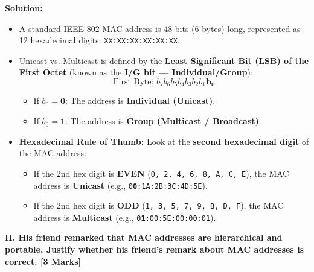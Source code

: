 \documentclass[11pt,a4paper]{article}
\begin{document}
\textbf{Solution:}
\begin{itemize}
    \item A standard IEEE 802 MAC address is 48 bits (6 bytes) long, represented as 12 hexadecimal digits: \texttt{XX:XX:XX:XX:XX:XX}.
    \item Unicast vs. Multicast is defined by the \textbf{Least Significant Bit (LSB) of the First Octet} (known as the \textbf{I/G bit --- Individual/Group}):
    \[
    \text{First Byte: } b_7 b_6 b_5 b_4 b_3 b_2 b_1 \mathbf{b_0}
    \]
    \begin{itemize}
        \item If $b_0 = \mathbf{0}$: The address is \textbf{Individual (Unicast)}.
        \item If $b_0 = \mathbf{1}$: The address is \textbf{Group (Multicast / Broadcast)}.
    \end{itemize}
    \item \textbf{Hexadecimal Rule of Thumb:} Look at the \textbf{second hexadecimal digit} of the MAC address:
    \begin{itemize}
        \item If the 2nd hex digit is \textbf{EVEN} (\texttt{0, 2, 4, 6, 8, A, C, E}), the MAC address is \textbf{Unicast} (e.g., \texttt{0\textbf{0}:1A:2B:3C:4D:5E}).
        \item If the 2nd hex digit is \textbf{ODD} (\texttt{1, 3, 5, 7, 9, B, D, F}), the MAC address is \textbf{Multicast} (e.g., \texttt{0\textbf{1}:00:5E:00:00:01}).
    \end{itemize}
\end{itemize}

\vspace{0.2cm}
\textbf{II. His friend remarked that MAC addresses are hierarchical and portable. Justify whether his friend's remark about MAC addresses is correct. [3 Marks]}
\end{document}
